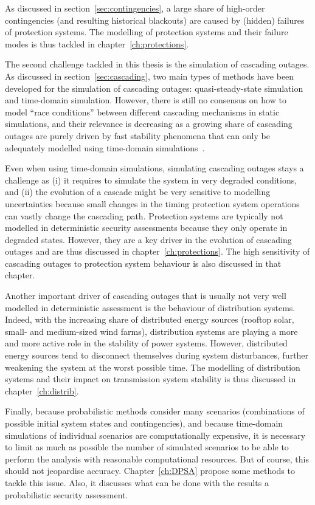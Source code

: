 As discussed in section~\ref{sec:contingencies}, a large share of high-order contingencies (and resulting historical blackouts) are caused by (hidden) failures of protection systems. The modelling of protection systems and their failure modes is thus tackled in chapter~\ref{ch:protections}.

The second challenge tackled in this thesis is the simulation of cascading outages. As discussed in section~\ref{sec:cascading}, two main types of methods have been developed for the simulation of cascading outages: quasi-steady-state simulation and time-domain simulation. However, there is still no consensus on how to model ``race conditions'' between different cascading mechanisms in static simulations, and their relevance is decreasing as a growing share of cascading outages are purely driven by fast stability phenomena that can only be adequately modelled using time-domain simulations~\cite{cascadeAcceleration}.

Even when using time-domain simulations, simulating cascading outages stays a challenge as (i) it requires to simulate the system in very degraded conditions, and (ii) the evolution of a cascade might be very sensitive to modelling uncertainties because small changes in the timing protection system operations can vastly change the cascading path. Protection systems are typically not modelled in deterministic security assessments because they only operate in degraded states. However, they are a key driver in the evolution of cascading outages and are thus discussed in chapter~\ref{ch:protections}. The high sensitivity of cascading outages to protection system behaviour is also discussed in that chapter. %

Another important driver of cascading outages that is usually not very well modelled in deterministic assessment is the behaviour of distribution systems. Indeed, with the increasing share of distributed energy sources (rooftop solar, small- and medium-sized wind farms), distribution systems are playing a more and more active role in the stability of power systems. However, distributed energy sources tend to disconnect themselves during system disturbances, further weakening the system at the worst possible time. The modelling of distribution systems and their impact on transmission system stability is thus discussed in chapter~\ref{ch:distrib}.

Finally, because probabilistic methods consider many scenarios (combinations of possible initial system states and contingencies), and because time-domain simulations of individual scenarios are computationally expensive, it is necessary to limit as much as possible the number of simulated scenarios to be able to perform the analysis with reasonable computational resources. But of course, this should not jeopardise accuracy. Chapter~\ref{ch:DPSA} propose some methods to tackle this issue. Also, it discusses what can be done with the results a probabilistic security assessment.
